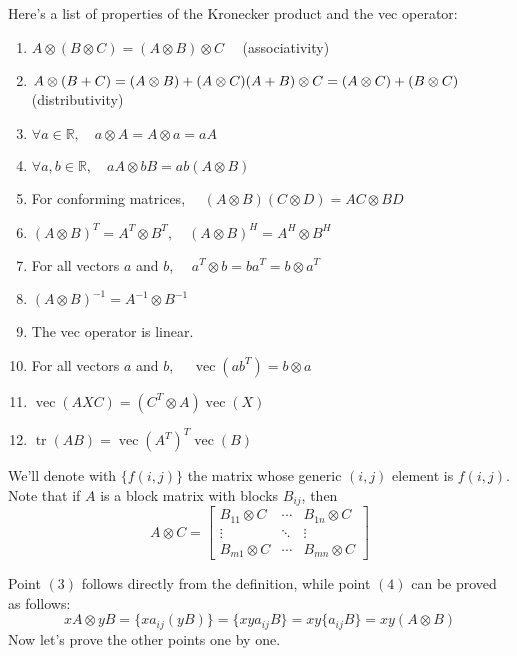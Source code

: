 \documentclass[a4paper,12pt]{article}
\begin{document}
Here's a list of properties of the Kronecker product and the vec operator:
\begin{enumerate}
    \item $ A\otimes (B\otimes C) = (A\otimes B)\otimes C\quad $ (associativity)
    \item $ A\otimes (B + C) = (A\otimes B) + (A\otimes C) \\
       (A + B)\otimes C = (A\otimes C) + (B\otimes C)\quad $ (distributivity)
    \item $ \forall a\in\mathbb R,\quad a\otimes A = A\otimes a = a A $
    \item $ \forall a,b\in\mathbb R,\quad a A\otimes b B = a b (A\otimes B) $
    \item For conforming matrices, $\quad(A\otimes B)(C\otimes D) = A C\otimes B D $
    \item $ (A\otimes B)^T = A^T\otimes B^T,\quad (A\otimes B)^H = A^H\otimes B^H $
    \item For all vectors $a$ and $b$, $\quad a^T\otimes b = b a^T = b\otimes a^T $
    \item $ (A\otimes B)^{-1} = A^{-1}\otimes B^{-1} $
    \item The vec operator is linear.
    \item For all vectors $a$ and $b$, $\quad\operatorname{vec}(ab^T) = b\otimes a $
    \item $ \operatorname{vec}(AXC) = (C^T\otimes A)\operatorname{vec}(X) $
    \item \label{itm:prop_twelve} $ \operatorname{tr}(AB) = \operatorname{vec}(A^T)^T \operatorname{vec}(B) $
\end{enumerate}

We'll denote with $\{f(i,j)\}$ the matrix whose generic $(i,j)$ element is $f(i,j)$. Note that if $A$ is a block matrix with blocks $B_{ij}$, then
$$
A\otimes C =
\begin{bmatrix}
B_{11}\otimes C & \cdots & B_{1n}\otimes C \\
\vdots & \ddots & \vdots \\
B_{m1}\otimes C & \cdots & B_{mn}\otimes C
\end{bmatrix}
$$

Point $(3)$ follows directly from the definition, while point $(4)$ can be proved as follows:
$$ xA\otimes yB = \{xa_{ij}(yB)\} = \{xya_{ij}B\} = xy\{a_{ij}B\} = xy(A\otimes B)
$$ Now let's prove the other points one by one.
\end{document}
